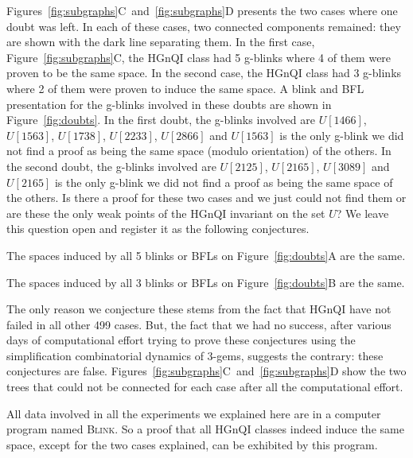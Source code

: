Figures~\ref{fig:subgraphs}C~and~\ref{fig:subgraphs}D presents the
two cases where one doubt was left. In each of these cases, two
connected components remained: they are shown with the dark line
separating them. In the first case, Figure~\ref{fig:subgraphs}C, the
HGnQI class had 5 g-blinks where 4 of them were proven to be the
same space. In the second case, the HGnQI class had 3 g-blinks where
2 of them were proven to induce the same space. A blink and BFL
presentation for the g-blinks involved in these doubts are shown in
Figure~\ref{fig:doubts}. In the first doubt, the g-blinks involved
are $U[1466]$, $U[1563]$, $U[1738]$, $U[2233]$, $U[2866]$ and
$U[1563]$ is the only g-blink we did not find a proof as being the
same space (modulo orientation) of the others. In the second doubt,
the g-blinks involved are $U[2125]$, $U[2165]$, $U[3089]$ and
 $U[2165]$ is the only g-blink we did not find a proof as
being the same space of the others. Is there a proof for these
two cases and we just could not find them or are these the only
weak points of the HGnQI invariant on the set $U$? We leave
this question open and register it as the following conjectures.

\begin{Conj} \label{conj:conjecture1}
The spaces induced by all 5 blinks or BFLs on Figure~\ref{fig:doubts}A
are the same.
\end{Conj}

\begin{Conj} \label{conj:conjecture2}
The spaces induced by all 3 blinks or BFLs on Figure~\ref{fig:doubts}B
are the same.
\end{Conj}

The only reason we conjecture these stems from the fact that
HGnQI have not failed in all other 499 cases. But,
the fact that we had no success, after various days of
computational effort trying to prove these conjectures
using the simplification combinatorial dynamics of 3-gems,
suggests the contrary: these conjectures are false.
Figures~\ref{fig:subgraphs}C~and~\ref{fig:subgraphs}D show the
two trees that could not be connected for
each case after all the computational effort.

All data involved in all the experiments we explained here are in a computer program named
\textsc{Blink}. So a proof that all HGnQI classes indeed induce the same space,
except for the two cases explained, can be exhibited by this program.

